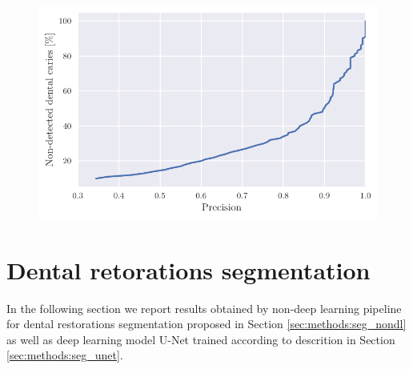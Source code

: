 \begin{figure}[H]
    \begin{floatrow}[2]
        { \includegraphics[width=\linewidth]{images/nondet_precision.pdf} }
    \end{floatrow}
\end{figure}

\section{Dental retorations segmentation}
In the following section we report results obtained by non-deep learning pipeline for dental restorations segmentation proposed in Section \ref{sec:methods:seg_nondl} as well as deep learning model U-Net trained according to descrition in Section \ref{sec:methods:seg_unet}.
\label{sec:dental_restoration_results}
